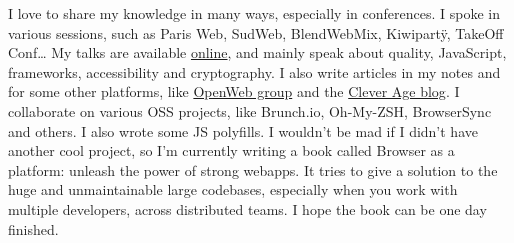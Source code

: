 
\begin{cvparagraph}
  I love to share my knowledge in many ways, especially in conferences. I spoke in various sessions, such as Paris Web, SudWeb, BlendWebMix, Kiwipartÿ, TakeOff Conf… My talks are available \href{https://github.com/m4dz/talks/tree/gh-pages}{online}, and mainly speak about quality, JavaScript, frameworks, accessibility and cryptography.
  I also write articles in my notes and for some other platforms, like \href{http://openweb.eu.org/}{OpenWeb group} and the \href{https://blog.clever-age.com/}{Clever Age blog}.
  I collaborate on various OSS projects, like Brunch.io, Oh-My-ZSH, BrowserSync and others. I also wrote some JS polyfills.
  I wouldn't be mad if I didn't have another cool project, so I'm currently writing a book called Browser as a platform: unleash the power of strong webapps. It tries to give a solution to the huge and unmaintainable large codebases, especially when you work with multiple developers, across distributed teams. I hope the book can be one day finished.
\end{cvparagraph}
